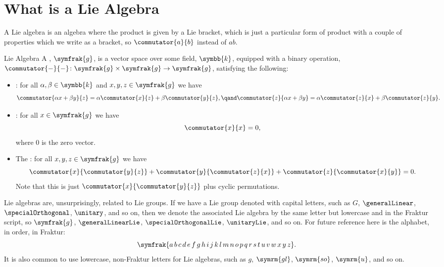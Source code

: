 \documentclass[fleqn]{NotesClass}
\renewcommand{\lie}[1]{\symfrak{#1}}
\renewcommand{\field}{\symbb{k}}
\begin{document}
    \section{What is a Lie Algebra}
    A Lie algebra is an algebra where the product is given by a Lie bracket, which is just a particular form of product with a couple of properties which we write as a bracket, so \(\commutator{a}{b}\) instead of \(ab\).
    
    \begin{dfn}{Lie Algebra}{}
        A , \(\lie{g}\), is a vector space over some field, \(\field\), equipped with a binary operation, \(\commutator{-}{-} \colon \lie{g} \times \lie{g} \to \lie{g}\), satisfying the following:
        \begin{itemize}
            \item {}: for all \(\alpha, \beta \in \field\) and \(x, y, z \in \lie{g}\) we have
            \begin{equation*}
                \commutator{\alpha x + \beta y}{z} = \alpha\commutator{x}{z} + \beta \commutator{y}{z}, \qand \commutator{z}{\alpha x + \beta y} = \alpha\commutator{z}{x} + \beta \commutator{z}{y}.
            \end{equation*}
            \item {}: for all \(x \in \lie{g}\) we have
            \begin{equation}
                \commutator{x}{x} = 0,
            \end{equation}
            where \(0\) is the zero vector.
            \item The : for all \(x, y, z \in \lie{g}\) we have
            \begin{equation}
                \commutator{x}{\commutator{y}{z}} + \commutator{y}{\commutator{z}{x}} + \commutator{z}{\commutator{x}{y}} = 0.
            \end{equation}
            Note that this is just \(\commutator{x}{\commutator{y}{z}}\) plus cyclic permutations.
        \end{itemize}
    \end{dfn}
    \begin{ntn}{}{}
        Lie algebras are, unsurprisingly, related to Lie groups.
        If we have a Lie group denoted with capital letters, such as \(G\), \(\generalLinear\), \(\specialOrthogonal\), \(\unitary\), and so on, then we denote the associated Lie algebra by the same letter but lowercase and in the Fraktur script, so \(\lie{g}\), \(\generalLinearLie\), \(\specialOrthogonalLie\), \(\unitaryLie\), and so on.
        For future reference here is the alphabet, in order, in Fraktur:
        \begin{equation}
            \lie{a \, b \, c \, d \, e \, f \, g \, h \, i \, j \, k \, l \, m \, n \, o \, p \, q \, r \, s \, t \, u \, v \, w \, x \, y \, z}.
        \end{equation}
        It is also common to use lowercase, non-Fraktur letters for Lie algebras, such as \(g\), \(\symrm{gl}\), \(\symrm{so}\), \(\symrm{u}\), and so on.
    \end{ntn}
    
\end{document}
